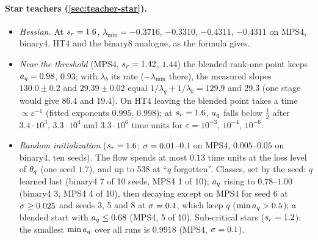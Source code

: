 \paragraph{Star teachers (\cref{sec:teacher-star}).}
\begin{itemize}
  \item \emph{Hessian.} At $s_{r}=1.6$, $\lambda_{\min}=-0.3716$, $-0.3310$, $-0.4311$, $-0.4311$ on MPS4, binary4, HT4
    and the binary8 analogue, as the formula gives.
  \item \emph{Near the threshold} (MPS4, $s_{r}=1.42$, $1.44$) the blended rank-one point keeps $a_{q}=0.98$, $0.93$;
    with $\lambda_b$ its rate ($-\lambda_{\min}$ there), the measured slopes $130.0\pm0.2$ and $29.39\pm0.02$ equal
    $1/\lambda_q+1/\lambda_b=129.9$ and $29.3$ (one stage would give $86.4$ and $19.4$). On HT4 leaving the blended point takes a time $\propto\varepsilon^{-1}$ (fitted exponents
    $0.995$, $0.998$); at $s_{r}=1.6$, $a_{q}$ falls below $\frac12$ after $3.4\cdot10^3$, $3.3\cdot10^4$ and $3.3\cdot10^6$ time
    units for $\varepsilon=10^{-3}$, $10^{-4}$, $10^{-6}$.
  \item \emph{Random initialization} ($s_{r}=1.6$; $\sigma=0.01$--$0.1$ on MPS4, $0.005$--$0.05$ on binary4, ten seeds).
    The flow spends at most $0.13$ time units at the loss level of $\theta_q$ (one seed $1.7$), and up to 538 at
    ``$q$ forgotten''. Classes, set by the seed: $q$ learned last (binary4 7 of 10 seeds, MPS4 1 of 10); $a_{q}$
    rising to $0.78$--$1.00$ (binary4 3, MPS4 4 of 10), then decaying except on MPS4 for seed 6 at $\sigma\ge0.025$ and
    seeds 3, 5 and 8 at $\sigma=0.1$, which keep $q$ ($\min a_{q}>0.5$); a blended start with $a_{q}\le0.68$ (MPS4, 5 of
    10). Sub-critical stars ($s_{r}=1.2$): the smallest $\min a_{q}$ over all runs is $0.9918$ (MPS4, $\sigma=0.1$).
\end{itemize}

